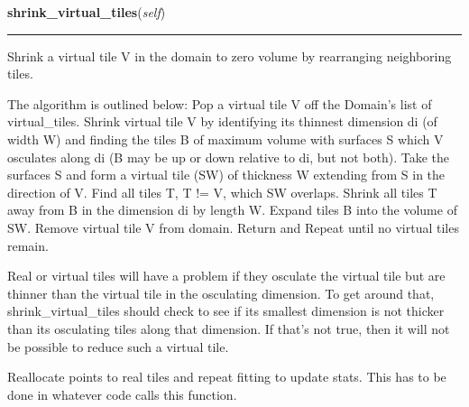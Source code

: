     \label{Tiling:Domain:shrink_virtual_tiles}

    \vspace{0.5ex}

\hspace{.8\funcindent}\begin{boxedminipage}{\funcwidth}

    \raggedright \textbf{shrink\_virtual\_tiles}(\textit{self})

    \vspace{-1.5ex}

    \rule{\textwidth}{0.5\fboxrule}
\setlength{\parskip}{2ex}
    Shrink a virtual tile V in the domain to zero volume by rearranging 
    neighboring tiles.

    The algorithm is outlined below: Pop a virtual tile V off the Domain's 
    list of virtual\_tiles. Shrink virtual tile V by identifying its 
    thinnest dimension di (of width W) and finding the tiles B of maximum 
    volume with surfaces S which V osculates along di (B may be up or down 
    relative to di, but not both). Take the surfaces S and form a virtual 
    tile (SW) of thickness W extending from S in the direction of V. Find 
    all tiles T, T != V, which SW overlaps. Shrink all tiles T away from B 
    in the dimension di by length W. Expand tiles B into the volume of SW. 
    Remove virtual tile V from domain. Return and Repeat until no virtual 
    tiles remain.

    Real or virtual tiles will have a problem if they osculate the virtual 
    tile but are thinner than the virtual tile in the osculating dimension.
    To get around that, shrink\_virtual\_tiles should check to see if its 
    smallest dimension is not thicker than its osculating tiles along that 
    dimension. If that's not true, then it will not be possible to reduce 
    such a virtual tile.

    Reallocate points to real tiles and repeat fitting to update stats. 
    This has to be done in whatever code calls this function.

\setlength{\parskip}{1ex}
    \end{boxedminipage}

    \label{Tiling:Domain:create_virtual_tiles}

    \vspace{0.5ex}

